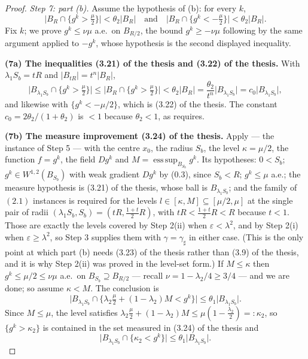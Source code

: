 \begin{proof}
\emph{Step 7: part \textup{(b)}.}  Assume the hypothesis of (b): for every $k$,
\[
\bigl|B_R\cap\{g^k>\tfrac\mu2\}\bigr|<\theta_2|B_R|
\quad\text{and}\quad
\bigl|B_R\cap\{g^k<-\tfrac\mu2\}\bigr|<\theta_2|B_R| .
\]
Fix $k$; we prove $g^k\le\nu\mu$ a.e.\ on $B_{R/2}$, the bound
$g^k\ge-\nu\mu$ following by the same argument applied to $-g^k$, whose
hypothesis is the second displayed inequality.

\textbf{(7a) The inequalities (3.21) of the thesis and (3.22) of the thesis.}  With
$\lambda_1S_b=tR$ and $|B_{tR}|=t^n|B_R|$,
\[
\bigl|B_{\lambda_1S_b}\cap\{g^k>\tfrac\mu2\}\bigr|
\le\bigl|B_R\cap\{g^k>\tfrac\mu2\}\bigr|
<\theta_2|B_R|=\frac{\theta_2}{t^n}\bigl|B_{\lambda_1S_b}\bigr|
=c_0\bigl|B_{\lambda_1S_b}\bigr| ,
\tag{3.21}
\]
and likewise with $\{g^k<-\mu/2\}$, which is (3.22) of the thesis.  The constant
$c_0=2\theta_2/(1+\theta_2)$ is $<1$ because $\theta_2<1$, as
 requires.

\textbf{(7b) The measure improvement (3.24) of the thesis.}  Apply
 --- the instance of Step 5 --- with the
centre $x_0$, the radius $S_b$, the level $\kappa=\mu/2$, the function $f=g^k$,
the field $Dg^k$ and $M=\operatorname{ess\,sup}_{B_{S_b}}g^k$.  Its hypotheses:
$0<S_b$; $g^k\in W^{1,2}(B_{S_b})$ with weak gradient $Dg^k$ by (0.3), since
$S_b<R$; $g^k\le\mu$ a.e.; the measure hypothesis is (3.21) of the thesis, whose
ball is $B_{\lambda_1S_b}$; and the family of $(2.1)$ instances is required for
the levels $l\in[\kappa,M]\subseteq[\mu/2,\mu]$ at the single pair of radii
$(\lambda_1S_b,S_b)=(tR,\tfrac{1+t}2R)$, with $tR<\tfrac{1+t}2R<R$ because
$t<1$.  Those are exactly the levels covered by Step 2(ii) when
$\varepsilon<\lambda^2$, and by Step 2(i) when $\varepsilon\ge\lambda^2$, so
Step 3 supplies them with $\gamma=\gamma_\sharp$ in either case.  (This is the
only point at which part (b) needs (3.23) of the thesis rather than (3.9) of the thesis,
and it is why Step 2(ii) was proved in the level-set form.)  If $M\le\kappa$
then $g^k\le\mu/2\le\nu\mu$ a.e.\ on $B_{S_b}\supseteq B_{R/2}$ --- recall
$\nu=1-\lambda_2/4\ge3/4$ --- and we are done; so assume $\kappa<M$.  The
conclusion is
\[
\bigl|B_{\lambda_1S_b}\cap\{\lambda_2\tfrac\mu2+(1-\lambda_2)M<g^k\}\bigr|
\le\theta_1\bigl|B_{\lambda_1S_b}\bigr| .
\tag{3.24}
\]
Since $M\le\mu$, the level satisfies
$\lambda_2\tfrac\mu2+(1-\lambda_2)M\le\mu(1-\tfrac{\lambda_2}2)=:\kappa_2$, so
$\{g^k>\kappa_2\}$ is contained in the set measured in (3.24) of the thesis and
\[
\bigl|B_{\lambda_1S_b}\cap\{\kappa_2<g^k\}\bigr|
\le\theta_1\bigl|B_{\lambda_1S_b}\bigr| .
\tag{3.24$'$}
\]


\end{proof}
